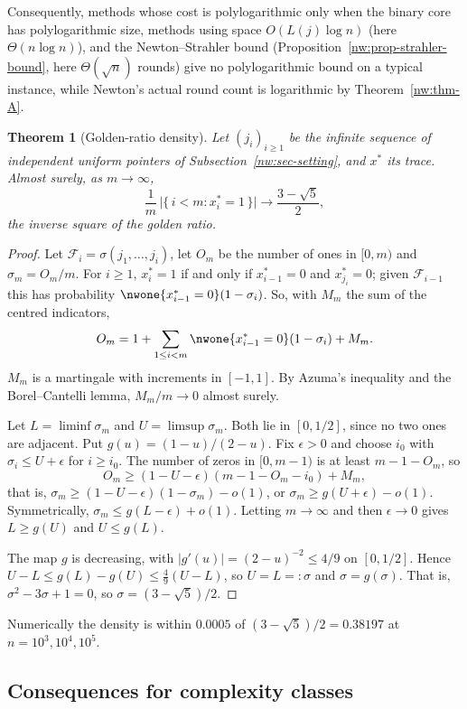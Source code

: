 \documentclass[11pt]{amsart}
\newtheorem{theorem}{Theorem}
\theoremstyle{definition}
\theoremstyle{remark}
\newcommand{\cF}{\mathcal{F}}
\begin{document}
Consequently, methods whose cost is polylogarithmic only when the binary core
has polylogarithmic size, methods using space $O(L(j)\log n)$ (here
$\Theta(n\log n)$), and the Newton--Strahler bound
(Proposition~\ref{nw:prop-strahler-bound}, here $\Theta(\sqrt n)$ rounds) give
no polylogarithmic bound on a typical instance, while Newton's actual round
count is logarithmic by Theorem~\ref{nw:thm-A}.

\begin{theorem}[Golden-ratio density]\label{nw:thm-density}
Let $(j_i)_{i\ge1}$ be the infinite sequence of independent uniform pointers
of Subsection~\ref{nw:sec-setting}, and $x^*$ its trace. Almost surely, as
$m\to\infty$,
\[
  \frac1m\,\bigl|\{\,i<m:x^*_i=1\,\}\bigr|\longrightarrow\frac{3-\sqrt5}{2},
\]
the inverse square of the golden ratio.
\end{theorem}

\begin{proof}
Let $\cF_i=\sigma(j_1,\dots,j_i)$, let $O_m$ be the number of ones in $[0,m)$
and $\sigma_m=O_m/m$. For $i\ge1$, $x^*_i=1$ if and only if $x^*_{i-1}=0$ and
$x^*_{j_i}=0$; given $\cF_{i-1}$ this has probability
$\nwone\{x^*_{i-1}=0\}(1-\sigma_i)$. So, with $M_m$ the sum of the centred
indicators,
\[
  O_m=1+\sum_{1\le i<m}\nwone\{x^*_{i-1}=0\}(1-\sigma_i)+M_m.
\]
$M_m$ is a martingale with increments in $[-1,1]$. By Azuma's inequality and
the Borel--Cantelli lemma, $M_m/m\to0$ almost surely.

Let $L=\liminf\sigma_m$ and $U=\limsup\sigma_m$. Both lie in $[0,1/2]$, since
no two ones are adjacent. Put $g(u)=(1-u)/(2-u)$. Fix $\epsilon>0$ and choose
$i_0$ with $\sigma_i\le U+\epsilon$ for $i\ge i_0$. The number of zeros in
$[0,m-1)$ is at least $m-1-O_m$, so
\[
  O_m\ge(1-U-\epsilon)(m-1-O_m-i_0)+M_m,
\]
that is, $\sigma_m\ge(1-U-\epsilon)(1-\sigma_m)-o(1)$, or
$\sigma_m\ge g(U+\epsilon)-o(1)$. Symmetrically,
$\sigma_m\le g(L-\epsilon)+o(1)$. Letting $m\to\infty$ and then
$\epsilon\to0$ gives $L\ge g(U)$ and $U\le g(L)$.

The map $g$ is decreasing, with $|g'(u)|=(2-u)^{-2}\le4/9$ on $[0,1/2]$.
Hence $U-L\le g(L)-g(U)\le\frac49(U-L)$, so $U=L=:\sigma$ and $\sigma=g(\sigma)$.
That is, $\sigma^2-3\sigma+1=0$, so $\sigma=(3-\sqrt5)/2$.
\end{proof}

Numerically the density is within $0.0005$ of $(3-\sqrt5)/2=0.38197$ at
$n=10^3,10^4,10^5$.

\subsection{Consequences for complexity classes}\label{nw:sec-classes}
\end{document}
